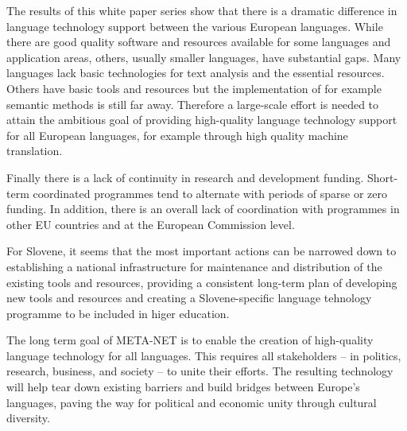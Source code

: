 \begin{multicols}{2}
The results of this white paper series show that there is a dramatic difference in language technology support between the various European languages. While there are good quality software and resources available for some languages and application areas, others, usually smaller languages, have substantial gaps. Many languages lack basic technologies for text analysis and the essential resources. Others have basic tools and resources but the implementation of for example semantic methods is still far away. Therefore a large-scale effort is needed to attain the ambitious goal of providing high-quality language technology support for all European languages, for example through high quality machine translation. 

Finally there is a lack of continuity in research and development funding. Short-term coordinated programmes tend to alternate with periods of sparse or zero funding. In addition, there is an overall lack of coordination with programmes in other EU countries and at the European Commission level.

For Slovene, it seems that the most important actions can be narrowed down to establishing a national infrastructure for maintenance and distribution of the existing tools and resources, providing a consistent long-term plan of developing new tools and resources and creating a Slovene-specific language tehnology programme to be included in higer education.

The long term goal of META-NET is to enable the creation of high-quality language technology for all languages. This requires all stakeholders -- in politics, research, business, and society -- to unite their efforts. The resulting technology will help tear down existing barriers and build bridges between Europe’s languages, paving the way for political and economic unity through cultural diversity. 
\end{multicols}

\clearpage


